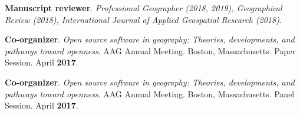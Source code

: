 \begin{cventries}
  \cventry
    {}
    {}
    {}
    {}
    {
       \begin{cvitems}
          \vspace{-3mm}
        \item {\textbf{Manuscript reviewer}. \textit{Professional Geographer
              (2018, 2019), Geographical Review (2018), International Journal of
            Applied Geospatial Research (2018)}. }
          \end{cvitems}
          }

  \cventry
    {}
    {}
    {}
    {}
    {
       \begin{cvitems}
          \vspace{-3mm}
        \item {\textbf{Co-organizer}. \textit{Open source software in geography:
              Theories, developments, and pathways toward openness}. AAG Annual
            Meeting. Boston, Massachusetts. Paper Session. April \textbf{2017}.}
          \end{cvitems}
          }

  \cventry
    {}
    {}
    {}
    {}
    {
       \begin{cvitems}
          \vspace{-3mm}
        \item {\textbf{Co-organizer}. \textit{Open source software in geography:
              Theories, developments, and pathways toward openness}. AAG Annual
            Meeting. Boston, Massachusetts. Panel Session. April \textbf{2017}.}
          \end{cvitems}
          }

\end{cventries}
